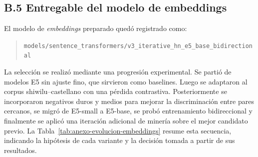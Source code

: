 \documentclass[12pt,a4paper,oneside]{book}
\newcommand{\filepath}[1]{\nolinkurl{#1}}
\begin{document}
\subsection*{B.5 Entregable del modelo de embeddings}

El modelo de \emph{embeddings} preparado quedó registrado como:

\begin{quote}
\filepath{models/sentence_transformers/v3_iterative_hn_e5_base_bidirectional}
\end{quote}

La selección se realizó mediante una progresión experimental. Se partió de modelos E5 sin ajuste fino, que sirvieron como baselines. Luego se adaptaron al corpus shiwilu--castellano con una pérdida contrastiva. Posteriormente se incorporaron negativos duros y medios para mejorar la discriminación entre pares cercanos, se migró de E5-small a E5-base, se probó entrenamiento bidireccional y finalmente se aplicó una iteración adicional de minería sobre el mejor candidato previo. La Tabla~\ref{tab:anexo-evolucion-embeddings} resume esta secuencia, indicando la hipótesis de cada variante y la decisión tomada a partir de sus resultados.
\end{document}
